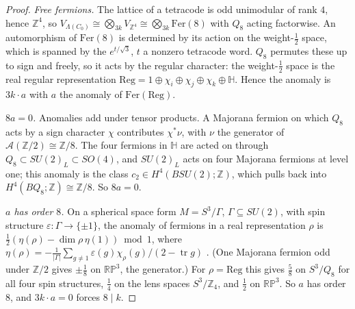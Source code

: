\documentclass[11pt]{amsart}
\theoremstyle{definition}
\begin{document}
\begin{proof}
\emph{Free fermions.} The lattice of a tetracode is odd unimodular of rank $4$, hence $\mathbb Z^4$, so
$V_{\Lambda(C_0)}\cong\bigotimes_{3k}V_{\mathbb Z^4}\cong\bigotimes_{3k}\mathrm{Fer}(8)$ with $Q_8$ acting
factorwise. An automorphism of $\mathrm{Fer}(8)$ is determined by its action on the weight-$\tfrac12$
space, which is spanned by the $e^{t/\sqrt3}$, $t$ a nonzero tetracode word. $Q_8$ permutes these up
to sign and freely, so it acts by the regular character: the weight-$\tfrac12$ space is the real
regular representation $\mathrm{Reg}=1\oplus\chi_i\oplus\chi_j\oplus\chi_k\oplus\mathbb H$. Hence the
anomaly is $3k\cdot a$ with $a$ the anomaly of $\mathrm{Fer}(\mathrm{Reg})$.

\emph{$8a=0$.} Anomalies add under tensor products. A Majorana fermion on which $Q_8$ acts by a sign
character $\chi$ contributes $\chi^*\nu$, with $\nu$ the generator of $\mathcal A(\mathbb Z/2)\cong
\mathbb Z/8$. The four fermions in $\mathbb H$ are acted on through $Q_8\subset SU(2)_L\subset SO(4)$,
and $SU(2)_L$ acts on four Majorana fermions at level one; this anomaly is the class
$c_2\in H^4(BSU(2);\mathbb Z)$, which pulls back into $H^4(BQ_8;\mathbb Z)\cong\mathbb Z/8$. So $8a=0$.

\emph{$a$ has order $8$.} On a spherical space form $M=S^3/\Gamma$, $\Gamma\subseteq SU(2)$, with spin
structure $\varepsilon\colon\Gamma\to\{\pm1\}$, the anomaly of fermions in a real representation $\rho$ is
$\tfrac12(\eta(\rho)-\dim\rho\,\eta(1))\bmod 1$, where
$\eta(\rho)=-\tfrac1{|\Gamma|}\sum_{g\neq1}\varepsilon(g)\chi_\rho(g)/(2-\operatorname{tr}g)$
\cite{Donnelly}. (One Majorana fermion odd under $\mathbb Z/2$ gives $\pm\tfrac18$ on $\mathbb{RP}^3$, the
generator.) For $\rho=\mathrm{Reg}$ this gives $\tfrac58$ on $S^3/Q_8$ for all four spin structures,
$\tfrac14$ on the lens spaces $S^3/\mathbb Z_4$, and $\tfrac12$ on $\mathbb{RP}^3$. So $a$ has order $8$,
and $3k\cdot a=0$ forces $8\mid k$.
\end{proof}
\end{document}
